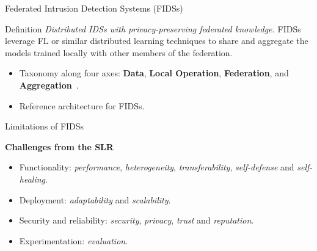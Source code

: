 \begin{frame}{Federated Intrusion Detection Systems (FIDSs)}

  \begin{block}{Definition}
    \textit{Distributed IDSs with privacy-preserving federated knowledge.}
    FIDSs leverage FL or similar distributed learning techniques to share and aggregate the models trained locally with other members of the federation.
  \end{block}

  \begin{itemize}
    \item<2-> Taxonomy along four axes: \textbf{Data}, \textbf{Local Operation}, \textbf{Federation}, and \textbf{Aggregation}~\autocite{lavaur_tnsm_2022}.
    \item<2-> Reference architecture for FIDSs.
    

    
  \end{itemize}


\end{frame}

\begin{frame}{Limitations of FIDSs}
  
  \textbf{Challenges from the SLR}~\cite{lavaur_tnsm_2022}
  \begin{itemize}
    \item Functionality: \emph{performance}, \emph<1>{\alert<2>{heterogeneity}}, \emph<1>{\alert<2>{transferability}}, \emph{self-defense} and \emph{self-healing}.
    \item Deployment: \emph{adaptability} and \emph{scalability}.
    \item Security and reliability: \emph{security}, \emph{privacy}, \emph<1>{\alert<2>{trust}} and \emph<1>{\alert<2>{reputation}}.
    \item Experimentation: \emph<1>{\alert<2>{evaluation}}.
  \end{itemize}

\end{frame}

